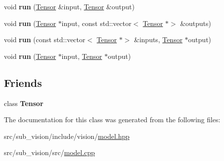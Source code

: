 \begin{DoxyCompactItemize}
\mbox{\label{classModel_a08e092b7c812a612d9ebeec7e53ffc8c}} 
void {\bfseries run} (\hyperlink{classTensor}{Tensor} \&input, \hyperlink{classTensor}{Tensor} \&output)
\item 
\mbox{\label{classModel_a27b77b2f792d42335b1144fc8052b5f6}} 
void {\bfseries run} (\hyperlink{classTensor}{Tensor} $\ast$input, const std\+::vector$<$ \hyperlink{classTensor}{Tensor} $\ast$$>$ \&outputs)
\item 
\mbox{\label{classModel_a3820410a91fcdc42f0b95ac530bbe076}} 
void {\bfseries run} (const std\+::vector$<$ \hyperlink{classTensor}{Tensor} $\ast$$>$ \&inputs, \hyperlink{classTensor}{Tensor} $\ast$output)
\item 
\mbox{\label{classModel_a69adac2817988199c16f5e76cb5e9ce3}} 
void {\bfseries run} (\hyperlink{classTensor}{Tensor} $\ast$input, \hyperlink{classTensor}{Tensor} $\ast$output)
\end{DoxyCompactItemize}
\subsection*{Friends}
\begin{DoxyCompactItemize}
\item 
\mbox{\label{classModel_a1663dd13ae2030687b72f6c5506bd033}} 
class {\bfseries Tensor}
\end{DoxyCompactItemize}


The documentation for this class was generated from the following files\+:\begin{DoxyCompactItemize}
\item 
src/sub\+\_\+vision/include/vision/\hyperlink{model_8hpp}{model.\+hpp}\item 
src/sub\+\_\+vision/src/\hyperlink{model_8cpp}{model.\+cpp}\end{DoxyCompactItemize}

